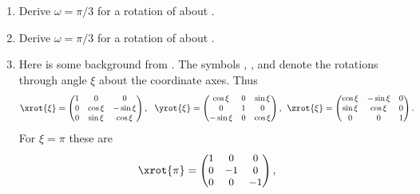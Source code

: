 \documentclass[11pt,titlepage,fleqn]{article}
\newcommand{\fvect}{\textcolor{red}{\mbT}}
\newcommand{\fvecp}{\textcolor{black}{\mbP}}
\begin{document}
\begin{enumerate}

\item Derive $\omega=\pi/3$ for a rotation of  about \fvecp.

\item Derive $\omega=\pi/3$ for a rotation of  about \fvect.

\item Here is some background from \citet{TapeTape2013}. The symbols \xrot{\xi}, \yrot{\xi}, and \zrot{\xi} denote the rotations through angle $\xi$ about the coordinate axes. Thus
%
\begin{equation*}
\xrot{\xi}=\begin{small}\begin{pmatrix}   1 &     0   & 0\\
                                          0 & \cos\xi &-\sin\xi\\
                                          0 & \sin\xi & \cos\xi\end{pmatrix}\end{small},\:\:\:
\yrot{\xi}=\begin{small}\begin{pmatrix}\cos\xi & 0 &\sin\xi \\
                                       0       & 1 & 0      \\
                                      -\sin\xi & 0 & \cos\xi\end{pmatrix}\end{small},\:\:
\zrot{\xi}=\begin{small}\begin{pmatrix}   \cos\xi & -\sin\xi & 0 \\
                                          \sin\xi & \cos\xi & 0 \\
                                          0  & 0 & 1\end{pmatrix}\end{small}.\:\:\:
\end{equation*}
%
For $\xi = \pi$ these are
%
\begin{equation*}
\xrot{\pi}=\begin{small}\begin{pmatrix}   1 &     0   & 0\\
                                          0 & -1 & 0\\
                                          0 & 0 & -1\end{pmatrix}\end{small},\:\:\:

\end{equation*}
\end{enumerate}
\end{document}
